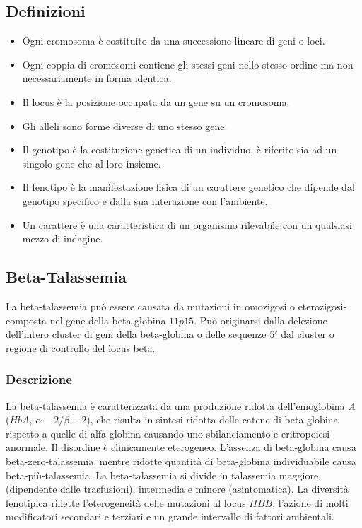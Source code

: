 \subsection{Definizioni}
\begin{itemize}
	\item Ogni cromosoma \`e costituito da una successione lineare di geni o loci.
	\item Ogni coppia di cromosomi contiene gli stessi geni nello stesso ordine ma non necessariamente in forma identica.
	\item Il locus \`e la posizione occupata da un gene su un cromosoma.
	\item Gli alleli sono forme diverse di uno stesso gene. 
	\item Il genotipo \`e la costituzione genetica di un individuo, \`e riferito sia ad un singolo gene che al loro insieme.
	\item Il fenotipo \`e la manifestazione fisica di un carattere genetico che dipende dal genotipo specifico e dalla sua interazione con l'ambiente. 
	\item Un carattere \`e una caratteristica di un organismo rilevabile con un qualsiasi mezzo di indagine. 
\end{itemize}
\subsection{Beta-Talassemia}
La beta-talassemia pu\`o essere causata da mutazioni in omozigosi o eterozigosi-composta nel gene della beta-globina $11p15$. Pu\`o originarsi dalla delezione dell'intero cluster di 
geni della beta-globina o delle sequenze $5'$ dal cluster o regione di controllo del locus beta. 
\subsubsection{Descrizione}
La beta-talassemia \`e caratterizzata da una produzione ridotta dell'emoglobina $A$ ($HbA$, $\alpha-2/\beta-2$), che risulta in sintesi ridotta delle catene di beta-globina rispetto
a quelle di alfa-globina causando uno sbilanciamento e eritropoiesi anormale. Il disordine \`e clinicamente eterogeneo. L'assenza di beta-globina causa beta-zero-talassemia, mentre
ridotte quantit\`a di beta-globina individuabile causa beta-pi\`u-talassemia. La beta-talassemia si divide in talassemia maggiore (dipendente dalle trasfusioni), intermedia e minore
(asintomatica). La diversit\`a fenotipica riflette l'eterogeneit\`a delle mutazioni al locus $HBB$, l'azione di molti modificatori secondari e terziari e un grande intervallo di 
fattori ambientali. 

